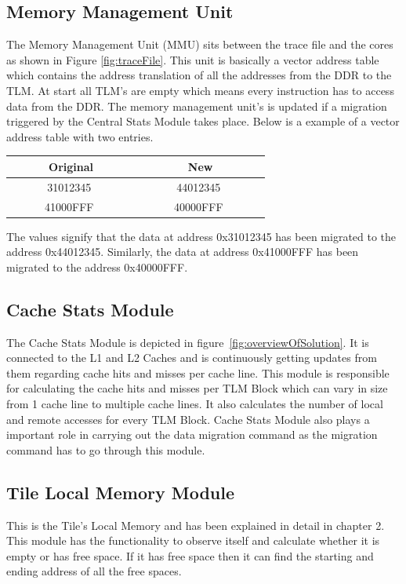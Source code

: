 \documentclass{listhesis}
\begin{document}
\subsection{Memory Management Unit}
The Memory Management Unit (MMU) sits between the trace file and the cores as shown in Figure \ref{fig:traceFile}. This unit is basically a vector address table which contains the address translation of all the addresses from the DDR to the TLM. At start all TLM's are empty which means every instruction has to access data from the DDR. The memory management unit's is updated if a migration triggered by the Central Stats Module takes place.
Below is a example of a vector address table with two entries.\\
\begin{center}
 \begin{tabular}{c | c } 
 \hline
 \textbf{Original} &  \textbf{New}  \\
 \hline
 \rule{0pt}{4ex}     \ \ \ \ \ \ 31012345 \ \ \ \ \ \ &   \ \ \ \ \ \ 44012345 \ \ \ \ \ \ \\ 
  \ \ \ \ \ \ 41000FFF \ \  \ \ \ \ &  \ \ \ \ \ \ 40000FFF \ \ \ \ \ \ \\ 
\end{tabular}
\end{center}
The values signify that the data at address 0x31012345 has been migrated to the address 0x44012345. Similarly, the data at address 0x41000FFF has been migrated to the address 0x40000FFF.
\subsection{Cache Stats Module}
The Cache Stats Module is depicted in figure~\ref{fig:overviewOfSolution}. It is connected to the L1 and L2 Caches and is continuously getting updates from them regarding cache hits and misses per cache line. This module is responsible for calculating the cache hits and misses per TLM Block which can vary in size from 1 cache line to multiple cache lines. It also calculates the number of local and remote accesses for every TLM Block. Cache Stats Module also plays a important role in carrying out the data migration command as the migration command has to go through this module. 
\subsection{Tile Local Memory Module}
This is the Tile's Local Memory and has been explained in detail in chapter 2. This module has the functionality to observe itself and calculate whether it is empty or has free space. If it has free space then it can find the starting and ending address of all the free spaces. 
\end{document}
